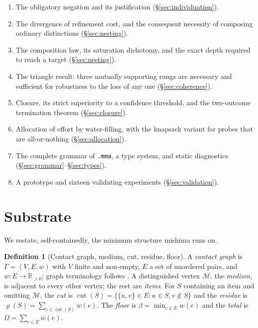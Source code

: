 \documentclass[11pt,twocolumn,a4paper]{article}
\theoremstyle{definition}
\newtheorem{definition}[theorem]{Definition}
\theoremstyle{remark}
\newcommand{\R}{\mathbb{R}}
\newcommand{\Rpos}{\R_{>0}}
\newcommand{\flo}{\beta}
\newcommand{\med}{\mathcal{M}}
\newcommand{\Gph}{\Gamma}
\newcommand{\cut}{\operatorname{cut}}
\newcommand{\wt}{w}
\newcommand{\res}{\varrho}
\newcommand{\Om}{\Omega}
\begin{document}
\begin{enumerate}[label=(\roman*),leftmargin=2.2em]
\item The obligatory negation and its justification (\S\ref{sec:individuation}).
\item The divergence of refinement cost, and the consequent necessity of
  composing ordinary distinctions (\S\ref{sec:nesting}).
\item The composition law, its saturation dichotomy, and the exact depth required
  to reach a target (\S\ref{sec:nesting}).
\item The triangle result: three mutually supporting rungs are necessary and
  sufficient for robustness to the loss of any one (\S\ref{sec:coherence}).
\item Closure, its strict superiority to a confidence threshold, and the
  two-outcome termination theorem (\S\ref{sec:closure}).
\item Allocation of effort by water-filling, with the knapsack variant for
  probes that are all-or-nothing (\S\ref{sec:allocation}).
\item The complete grammar of \texttt{.mma}, a type system, and static
  diagnostics (\S\ref{sec:grammar}--\S\ref{sec:types}).
\item A prototype and sixteen validating experiments (\S\ref{sec:validation}).
\end{enumerate}

\section{Substrate}
\label{sec:substrate}

We restate, self-containedly, the minimum structure mishima runs on.

\begin{definition}[Contact graph, medium, cut, residue, floor]
\label{def:substrate}
A \emph{contact graph} is $\Gph=(V,E,\wt)$ with $V$ finite and non-empty, $E$ a
set of unordered pairs, and $\wt\colon E\to\Rpos$; graph terminology follows
\citet{diestel2010graph}. A distinguished vertex $\med$, the \emph{medium}, is
adjacent to every other vertex; the rest are \emph{items}. For $S$ containing an
item and omitting $\med$, the \emph{cut} is
$\cut(S)=\{\{u,v\}\in E: u\in S, v\notin S\}$ and the \emph{residue} is
$\res(S)=\sum_{e\in\cut(S)}\wt(e)$. The \emph{floor} is $\flo=\min_{e\in E}\wt(e)$
and the \emph{total} is $\Om=\sum_{e\in E}\wt(e)$.
\end{definition}
\end{document}
